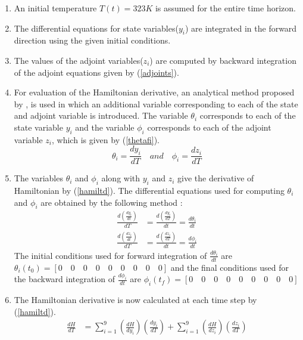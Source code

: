 \documentclass[3p,times,authoryear]{elsarticle}
\begin{document}
\begin{enumerate}
\item An initial temperature $T(t) = 323 K$ is assumed for the entire time horizon.
\item The differential equations for state variables($y_{i}$) are integrated in the forward direction using the given initial conditions.
\item The values of the adjoint variables($z_{i}$) are computed by backward integration of the adjoint equations given by (\ref{adjoints}).
\item For evaluation of the Hamiltonian derivative, an analytical method proposed by \cite{benavides}, is used in which an additional variable corresponding to each of the state and adjoint variable is introduced. The variable $\theta_{i}$ corresponds to each of the state variable $y_{i}$ and the variable $\phi_{i}$ corresponds to each of the adjoint variable $z_{i}$, which is given by (\ref{thetafi}).
\begin{equation}
\theta_{i} = \frac{dy_{i}}{dT} \quad and \quad \phi_{i} = \frac{dz_{i}}{dT} \label{thetafi} 
\end{equation}
\item The variables $\theta_{i}$ and $\phi_{i}$ along with $y_{i}$ and $z_{i}$ give the derivative of Hamiltonian by (\ref{hamiltd}). The differential equations used for computing $\theta_{i}$ and $\phi_{i}$ are obtained by the following method :  
\begin{align}
\frac{d\left( \frac{dy_{i}}{dt}  \right)}{dT} &= \frac{d\left( \frac{dy_{i}}{dT}  \right)}{dt} = \frac{d\theta_{i}}{dt} \label{theta}\\
\frac{d\left( \frac{dz_{i}}{dt}  \right)}{dT} &= \frac{d\left( \frac{dz_{i}}{dT}  \right)}{dt} = \frac{d\phi_{i}}{dt} \label{phi}
\end{align}
The initial conditions used for forward integration of $\frac{d\theta_{i}}{dt}$ are $\theta_{i}(t_{0}) = \left[  0 \quad 0 \quad 0 \quad 0 \quad 0 \quad 0 \quad 0 \quad 0 \quad 0 \right]$ and the final conditions used for the backward integration of $\frac{d\phi_{i}}{dt}$ are $\phi_{i}(t_{f}) = \left[  0 \quad 0 \quad 0 \quad 0 \quad 0 \quad 0 \quad 0 \quad 0 \quad 0 \right]$  
\item The Hamiltonian derivative is now calculated at each time step by (\ref{hamiltd}). 
\begin{align}
\frac{dH}{dT} &= \sum_{i=1}^{9} \left( \frac{dH}{dy_{i}}\right)\left(	\frac{dy_{i}}{dT} \right) + \sum_{i=1}^{9} \left(\frac{dH}{dz_{i}}\right)\left(\frac{dz_{i}}{dT} \right) \\

\end{align}
\end{enumerate}
\end{document}
